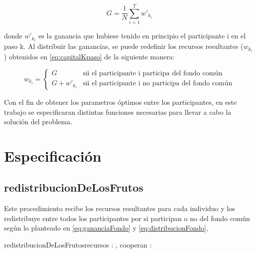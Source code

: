\documentclass[10pt,a4paper]{article}
\begin{document}
\begin{equation}
 G=\frac{1}{N}\sum_{i=1}^{T}{w'}_{k_i}
\label{eq:gananciaFondo}
\end{equation}

donde ${w'}_{k_i}$ es la ganancia que hubiese tenido en principio el participante i en el paso k. Al distribuir las ganancias, se puede redefinir los recursos resultantes ($w_{k_i}$) obtenidos en \autoref{eq:capitalKpaso} de la siguiente manera:


\begin{equation}
w_{k_i} = \begin{cases}
G & \text{sii el participante i participa del fondo común} \\
G + {w'}_{k_i} & \text{sii el participante i no participa del fondo común}
\end{cases}
\label{eq:distribucionFondo}
\end{equation}



Con el fin de obtener los parametros óptimos entre los participantes, en este trabajo se especificaran distintas funciones necesarias para llevar a cabo la solución del problema. 


\clearpage
\section{Especificación}
\subsection{redistribucionDeLosFrutos}
Este procedimiento recibe los recursos resultantes para cada individuo y los redistribuye entre todos los participantes por si participan o no del fondo común según lo planteado en \autoref{eq:gananciaFondo} y  \autoref{eq:distribucionFondo},
\begin{proc}{redistribucionDeLosFrutos}{\In recursos : \TLista{\float}, \In cooperan : \TLista{\bool}}
{\TLista{\float}}
    


\end{proc}
\end{document}
